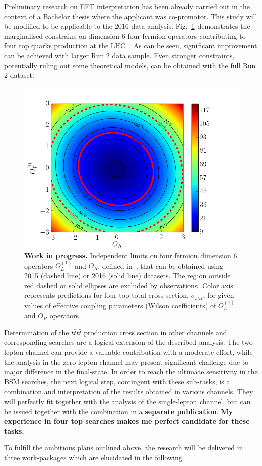 \textcolor{\mynew}{
Preliminary research on EFT interpretation has been already carried out in the context of a Bachelor thesis where the applicant was co-promotor. This study will be modified to be applicable to the 2016 data analysis. Fig.~\ref{fig:C1_C2} demonstrates the marginalised constrains on dimension-6 four-fermion operators contributing to four top quarks production at the LHC~\cite{MathiasThesis,DegrandeEFTthesis,Zhang:2017mls}. As can be seen, significant improvement can be achieved with larger Run 2 data sample. Even stronger constraints, potentially ruling out some theoretical models, can be obtained with the full Run 2 dataset.
\begin{figure}[t]
\centering
\includegraphics[width=0.7\linewidth]{figures/C1_C2}
\caption{\textbf{Work in progress.} Independent limits on four fermion dimension 6 operators $O_{L}^{\left(1 \right) }$ and $O_R$, defined in~\cite{DegrandeEFTthesis}, that can be obtained using 2015 (dashed line) or 2016 (solid line) datasets. The region outside red dashed or solid ellipses are excluded by observations. Color axis represents predictions for four top total cross section, $\sigma_{t\bar{t}t\bar{t}}$, for given values of effective coupling parameters (Wilson coefficients) of $O_{L}^{\left(1 \right) }$ and $O_R$ operators.}
\label{fig:C1_C2}
\end{figure} 
}

\textcolor{\mycolor}{
Determination of the $t\bar{t}t\bar{t}$ production cross section in other channels and corresponding searches are a logical extension of the described analysis. The two-lepton channel can provide a valuable contribution with a moderate effort, while the analysis in the zero-lepton channel may present significant challenge due to major difference in the final-state. In order to reach the ultimate sensitivity in the BSM searches, the next logical step, contingent with these sub-tasks, is a combination and interpretation of the results obtained in various channels. They will perfectly fit together with the analysis of the single-lepton channel, but can be issued together with the combination in a \textbf{separate publication}. \textbf{My experience in four top searches makes me perfect candidate for these tasks.}}

\textcolor{\mycolor}{
To fulfill the ambitious plans outlined above, the research will be delivered in three work-packages which are elucidated in the following.}
